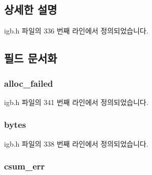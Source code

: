 \subsection{상세한 설명}


igb.\+h 파일의 336 번째 라인에서 정의되었습니다.



\subsection{필드 문서화}
\subsubsection[{\texorpdfstring{alloc\+\_\+failed}{alloc_failed}}]{ alloc\+\_\+failed}\hypertarget{structigb__rx__queue__stats_a260763fb6a6e3c1a33dc38d7e46bd610}{}\label{structigb__rx__queue__stats_a260763fb6a6e3c1a33dc38d7e46bd610}


igb.\+h 파일의 341 번째 라인에서 정의되었습니다.

\subsubsection[{\texorpdfstring{bytes}{bytes}}]{ bytes}\hypertarget{structigb__rx__queue__stats_a1b0587fe9418ec065eee9e7593528b12}{}\label{structigb__rx__queue__stats_a1b0587fe9418ec065eee9e7593528b12}


igb.\+h 파일의 338 번째 라인에서 정의되었습니다.

\subsubsection[{\texorpdfstring{csum\+\_\+err}{csum_err}}]{ csum\+\_\+err}\hypertarget{structigb__rx__queue__stats_a62812d439bcb04e61a26b8e80895b0a6}{}\label{structigb__rx__queue__stats_a62812d439bcb04e61a26b8e80895b0a6}


